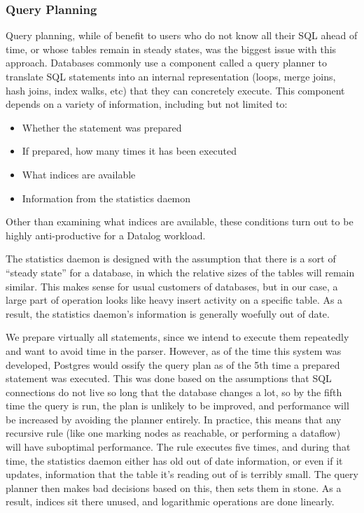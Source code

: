 \subsubsection{Query Planning}
Query planning, while of benefit to users who do not know all their SQL ahead of time, or whose tables remain in steady states, was the biggest issue with this approach.
Databases commonly use a component called a query planner to translate SQL statements into an internal representation (loops, merge joins, hash joins, index walks, etc) that they can concretely execute.
This component depends on a variety of information, including but not limited to:
\begin{itemize}
	\item Whether the statement was prepared
	\item If prepared, how many times it has been executed
	\item What indices are available
	\item Information from the statistics daemon
\end{itemize}
Other than examining what indices are available, these conditions turn out to be highly anti-productive for a Datalog workload.

The statistics daemon is designed with the assumption that there is a sort of ``steady state'' for a database, in which the relative sizes of the tables will remain similar.
This makes sense for usual customers of databases, but in our case, a large part of operation looks like heavy insert activity on a specific table.
As a result, the statistics daemon's information is generally woefully out of date.

We prepare virtually all statements, since we intend to execute them repeatedly and want to avoid time in the parser.
However, as of the time this system was developed, Postgres would ossify the query plan as of the 5th time a prepared statement was executed.
This was done based on the assumptions that SQL connections do not live so long that the database changes a lot, so by the fifth time the query is run, the plan is unlikely to be improved, and performance will be increased by avoiding the planner entirely.
In practice, this means that any recursive rule (like one marking nodes as reachable, or performing a dataflow) will have suboptimal performance.
The rule executes five times, and during that time, the statistics daemon either has old out of date information, or even if it updates, information that the table it's reading out of is terribly small.
The query planner then makes bad decisions based on this, then sets them in stone.
As a result, indices sit there unused, and logarithmic operations are done linearly.

